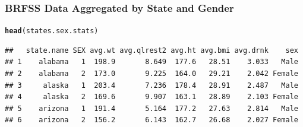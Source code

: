 \documentclass{beamer}\usepackage[]{graphicx}\usepackage[]{color}
\makeatletter
\newcommand{\hlstd}[1]{\textcolor[rgb]{0.345,0.345,0.345}{#1}}%
\newcommand{\hlkwd}[1]{\textcolor[rgb]{0.737,0.353,0.396}{\textbf{#1}}}%
\newenvironment{kframe}{%
 \def\at@end@of@kframe{}%
 \ifinner\ifhmode%
  \def\at@end@of@kframe{\end{minipage}}%
  \begin{minipage}{\columnwidth}%
 \fi\fi%
 \def\FrameCommand##1{\hskip\@totalleftmargin \hskip-\fboxsep
 \colorbox{shadecolor}{##1}\hskip-\fboxsep
     \hskip-\linewidth \hskip-\@totalleftmargin \hskip\columnwidth}%
 \MakeFramed {\advance\hsize-\width
   \@totalleftmargin\z@ \linewidth\hsize
   \@setminipage}}%
 {\par\unskip\endMakeFramed%
 \at@end@of@kframe}
\newenvironment{knitrout}{}{} %
\makeatother
\begin{document}

\begin{frame}[fragile]
    \frametitle{BRFSS Data Aggregated by State and Gender}
    
    \small
\begin{knitrout}\footnotesize
{}\color{fgcolor}\begin{kframe}
\begin{alltt}
\hlkwd{head}\hlstd{(states.sex.stats)}
\end{alltt}
\begin{verbatim}
##   state.name SEX avg.wt avg.qlrest2 avg.ht avg.bmi avg.drnk    sex
## 1    alabama   1  198.9       8.649  177.6   28.51    3.033   Male
## 2    alabama   2  173.0       9.225  164.0   29.21    2.042 Female
## 3     alaska   1  203.4       7.236  178.4   28.91    2.487   Male
## 4     alaska   2  169.6       9.907  163.1   28.89    2.103 Female
## 5    arizona   1  191.4       5.164  177.2   27.63    2.814   Male
## 6    arizona   2  156.2       6.143  162.7   26.68    2.027 Female
\end{verbatim}
\end{kframe}
\end{knitrout}
    \normalsize
\end{frame}


\end{document}

